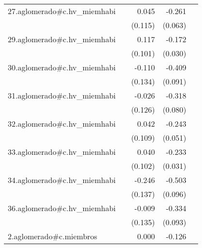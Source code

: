 {\begin{longtable}{l*{4}{D{.}{.}{-1}}}
\addlinespace
27.aglomerado#c.hv\_miemhabi&                     &       0.045         &      -0.261\sym{***}&                     \\
            &                     &     (0.115)         &     (0.063)         &                     \\
\addlinespace
29.aglomerado#c.hv\_miemhabi&                     &       0.117         &      -0.172\sym{***}&                     \\
            &                     &     (0.101)         &     (0.030)         &                     \\
\addlinespace
30.aglomerado#c.hv\_miemhabi&                     &      -0.110         &      -0.409\sym{***}&                     \\
            &                     &     (0.134)         &     (0.091)         &                     \\
\addlinespace
31.aglomerado#c.hv\_miemhabi&                     &      -0.026         &      -0.318\sym{***}&                     \\
            &                     &     (0.126)         &     (0.080)         &                     \\
\addlinespace
32.aglomerado#c.hv\_miemhabi&                     &       0.042         &      -0.243\sym{***}&                     \\
            &                     &     (0.109)         &     (0.051)         &                     \\
\addlinespace
33.aglomerado#c.hv\_miemhabi&                     &       0.040         &      -0.233\sym{***}&                     \\
            &                     &     (0.102)         &     (0.031)         &                     \\
\addlinespace
34.aglomerado#c.hv\_miemhabi&                     &      -0.246         &      -0.503\sym{***}&                     \\
            &                     &     (0.137)         &     (0.096)         &                     \\
\addlinespace
36.aglomerado#c.hv\_miemhabi&                     &      -0.009         &      -0.334\sym{***}&                     \\
            &                     &     (0.135)         &     (0.093)         &                     \\
\addlinespace
2.aglomerado#c.miembros&                     &       0.000         &      -0.126\sym{***}&                     \\

\end{longtable}}
